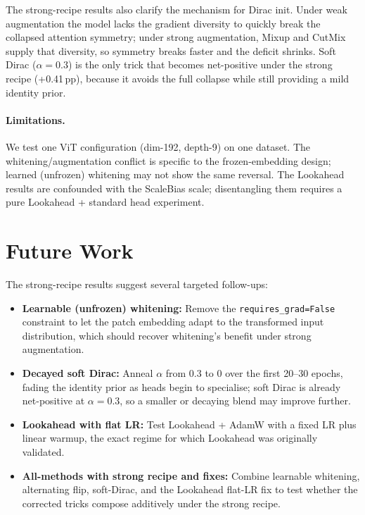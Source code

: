 \documentclass[10pt,twocolumn]{article}
\newcommand{\pp}{\,pp}   %
\begin{document}
The strong-recipe results also clarify the mechanism for Dirac init.
Under weak augmentation the model lacks the gradient diversity to quickly break the collapsed attention symmetry; under strong augmentation, Mixup and CutMix supply that diversity, so symmetry breaks faster and the deficit shrinks.
Soft Dirac ($\alpha{=}0.3$) is the only trick that becomes net-positive under the strong recipe (+0.41\pp{}), because it avoids the full collapse while still providing a mild identity prior.

\paragraph{Limitations.}
We test one ViT configuration (dim-192, depth-9) on one dataset.
The whitening/augmentation conflict is specific to the frozen-embedding design; learned (unfrozen) whitening may not show the same reversal.
The Lookahead results are confounded with the ScaleBias scale; disentangling them requires a pure Lookahead + standard head experiment.

\section{Future Work}\label{sec:future}

The strong-recipe results suggest several targeted follow-ups:
\begin{itemize}[leftmargin=*, topsep=2pt, itemsep=1pt]
    \item \textbf{Learnable (unfrozen) whitening:} Remove the \texttt{requires\_grad=False} constraint to let the patch embedding adapt to the transformed input distribution, which should recover whitening's benefit under strong augmentation.
    \item \textbf{Decayed soft Dirac:} Anneal $\alpha$ from 0.3 to 0 over the first 20--30 epochs, fading the identity prior as heads begin to specialise; soft Dirac is already net-positive at $\alpha{=}0.3$, so a smaller or decaying blend may improve further.
    \item \textbf{Lookahead with flat LR:} Test Lookahead + AdamW with a fixed LR plus linear warmup, the exact regime for which Lookahead was originally validated.
    \item \textbf{All-methods with strong recipe and fixes:} Combine learnable whitening, alternating flip, soft-Dirac, and the Lookahead flat-LR fix to test whether the corrected tricks compose additively under the strong recipe.
\end{itemize}
\end{document}
